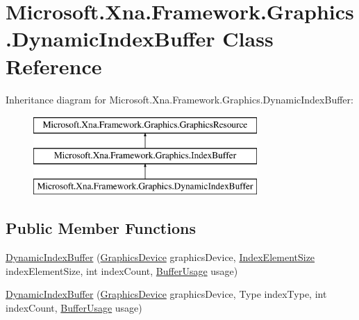 \hypertarget{class_microsoft_1_1_xna_1_1_framework_1_1_graphics_1_1_dynamic_index_buffer}{}\section{Microsoft.\+Xna.\+Framework.\+Graphics.\+Dynamic\+Index\+Buffer Class Reference}
\label{class_microsoft_1_1_xna_1_1_framework_1_1_graphics_1_1_dynamic_index_buffer}
Inheritance diagram for Microsoft.\+Xna.\+Framework.\+Graphics.\+Dynamic\+Index\+Buffer\+:\begin{figure}[H]
\begin{center}
\leavevmode
\includegraphics[height=3.000000cm]{class_microsoft_1_1_xna_1_1_framework_1_1_graphics_1_1_dynamic_index_buffer}
\end{center}
\end{figure}
\subsection*{Public Member Functions}
\begin{DoxyCompactItemize}
\item 
\hyperlink{class_microsoft_1_1_xna_1_1_framework_1_1_graphics_1_1_dynamic_index_buffer_a3d29922ff359949510ea95efde4ed056}{Dynamic\+Index\+Buffer} (\hyperlink{class_microsoft_1_1_xna_1_1_framework_1_1_graphics_1_1_graphics_device}{Graphics\+Device} graphics\+Device, \hyperlink{namespace_microsoft_1_1_xna_1_1_framework_1_1_graphics_a618ec26accdaa8f268cde18edafab245}{Index\+Element\+Size} index\+Element\+Size, int index\+Count, \hyperlink{namespace_microsoft_1_1_xna_1_1_framework_1_1_graphics_a8ccf7bb06c26840f01836a64d983367b}{Buffer\+Usage} usage)
\item 
\hyperlink{class_microsoft_1_1_xna_1_1_framework_1_1_graphics_1_1_dynamic_index_buffer_ab029c359085d3c8d920cfdf2dcf36f2e}{Dynamic\+Index\+Buffer} (\hyperlink{class_microsoft_1_1_xna_1_1_framework_1_1_graphics_1_1_graphics_device}{Graphics\+Device} graphics\+Device, Type index\+Type, int index\+Count, \hyperlink{namespace_microsoft_1_1_xna_1_1_framework_1_1_graphics_a8ccf7bb06c26840f01836a64d983367b}{Buffer\+Usage} usage)
\end{DoxyCompactItemize}
